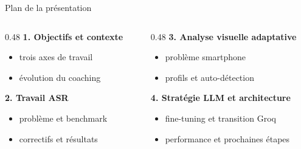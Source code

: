 \documentclass[10pt,aspectratio=169]{beamer}
\begin{document}
\begin{frame}{Plan de la présentation}
\begin{columns}[T]
\begin{column}{0.48\textwidth}
\textbf{1. Objectifs et contexte}
\begin{itemize}
    \item trois axes de travail
    \item évolution du coaching
\end{itemize}
\vspace{0.3cm}
\textbf{2. Travail ASR}
\begin{itemize}
    \item problème et benchmark
    \item correctifs et résultats
\end{itemize}
\end{column}
\begin{column}{0.48\textwidth}
\textbf{3. Analyse visuelle adaptative}
\begin{itemize}
    \item problème smartphone
    \item profils et auto-détection
\end{itemize}
\vspace{0.3cm}
\textbf{4. Stratégie LLM et architecture}
\begin{itemize}
    \item fine-tuning et transition Groq
    \item performance et prochaines étapes
\end{itemize}
\end{column}
\end{columns}
\end{frame}
\end{document}
